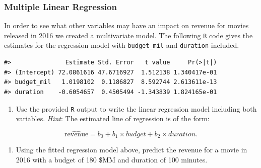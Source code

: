 \documentclass[
]{report}
\newenvironment{Shaded}{\begin{snugshade}}{\end{snugshade}}
\newcommand{\AttributeTok}[1]{\textcolor[rgb]{0.77,0.63,0.00}{#1}}
\newcommand{\CommentTok}[1]{\textcolor[rgb]{0.56,0.35,0.01}{\textit{#1}}}
\newcommand{\FunctionTok}[1]{\textcolor[rgb]{0.00,0.00,0.00}{#1}}
\newcommand{\NormalTok}[1]{#1}
\newcommand{\OtherTok}[1]{\textcolor[rgb]{0.56,0.35,0.01}{#1}}
\newcommand{\SpecialCharTok}[1]{\textcolor[rgb]{0.00,0.00,0.00}{#1}}
\providecommand{\tightlist}{%
  \setlength{\itemsep}{0pt}\setlength{\parskip}{0pt}}
\begin{document}
\vspace{0.8in}

\newpage

\hypertarget{multiple-linear-regression}{%
\subsubsection*{Multiple Linear Regression}\label{multiple-linear-regression}}

In order to see what other variables may have an impact on revenue for movies released in 2016 we created a multivariate model. The following \texttt{R} code gives the estimates for the regression model with \texttt{budget\_mil} and \texttt{duration} included.

\begin{Shaded}
\end{Shaded}

\begin{verbatim}
#>               Estimate Std. Error   t value     Pr(>|t|)
#> (Intercept) 72.0861616 47.6716927  1.512138 1.340417e-01
#> budget_mil   1.0198102  0.1186827  8.592744 2.613611e-13
#> duration    -0.6054657  0.4505494 -1.343839 1.824165e-01
\end{verbatim}

\begin{enumerate}
\def\labelenumi{\arabic{enumi}.}
\setcounter{enumi}{10}
\tightlist
\item
  Use the provided \texttt{R} output to write the linear regression model including both variables. \emph{Hint}: The estimated line of regression is of the form:
\end{enumerate}

\[\widehat{\text{revenue}} = b_0 + b_1\times budget + b_2\times duration.\]

\vspace{1in}

\begin{enumerate}
\def\labelenumi{\arabic{enumi}.}
\setcounter{enumi}{11}
\tightlist
\item
  Using the fitted regression model above, predict the revenue for a movie in 2016 with a budget of 180 \$MM and duration of 100 minutes.
\end{enumerate}
\end{document}

